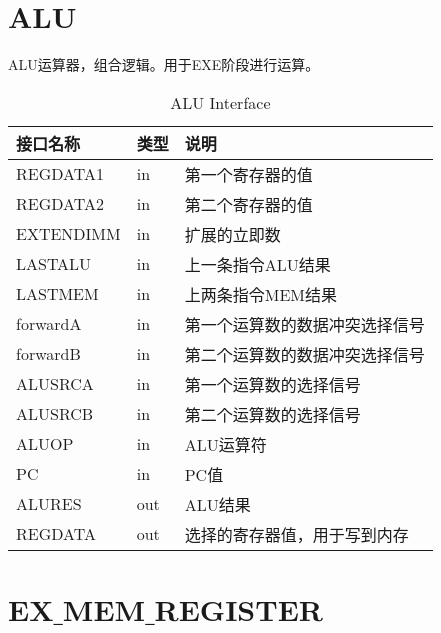 
\section{ALU}

ALU运算器，组合逻辑。用于EXE阶段进行运算。

\begin{center}
\renewcommand{\arraystretch}{1.3}
\small
\begin{longtable}{|p{3cm}<{\centering}|p{1.4cm}<{\centering}|p{7cm}<{\centering}|}
\caption{ALU Interface}
\label{tab:treatments}\\
\hline
接口名称 & 类型 & 说明 \\
\hline
REGDATA1 & in & 第一个寄存器的值 \\
\hline
REGDATA2 & in & 第二个寄存器的值 \\
\hline
EXTENDIMM & in & 扩展的立即数 \\
\hline
LASTALU & in & 上一条指令ALU结果 \\
\hline
LASTMEM & in & 上两条指令MEM结果 \\
\hline
forwardA & in & 第一个运算数的数据冲突选择信号 \\
\hline
forwardB & in & 第二个运算数的数据冲突选择信号 \\
\hline
ALUSRCA & in & 第一个运算数的选择信号 \\
\hline
ALUSRCB & in &  第二个运算数的选择信号 \\
\hline
ALUOP & in & ALU运算符 \\
\hline
PC & in & PC值 \\
\hline
ALURES & out & ALU结果 \\
\hline
REGDATA & out & 选择的寄存器值，用于写到内存 \\
\hline
\end{longtable}
\end{center}


\section{EX$\_$MEM$\_$REGISTER}

